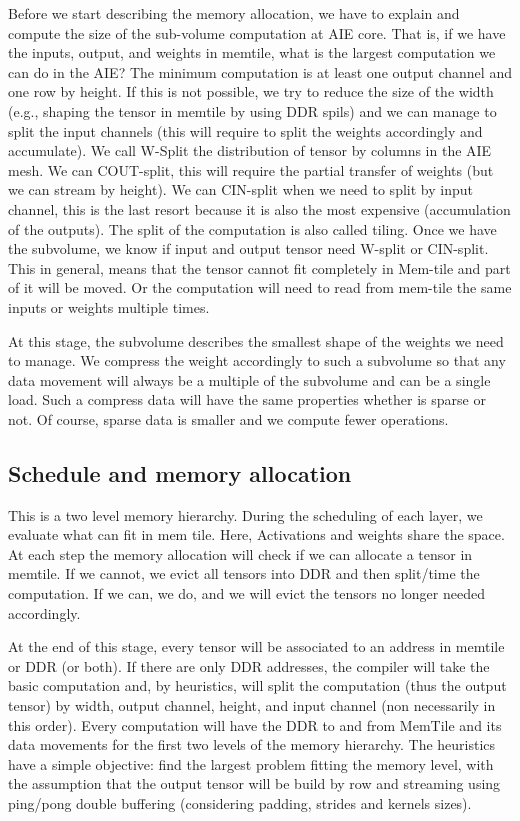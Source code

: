 \documentclass[conference]{IEEEtran}
\begin{document}
Before we start describing the memory allocation, we have to explain
and compute the size of the sub-volume computation at AIE core.  That
is, if we have the inputs, output, and weights in memtile, what is the
largest computation we can do in the AIE? The minimum computation is
at least one output channel and one row by height. If this is not
possible, we try to reduce the size of the width (e.g., shaping the
tensor in memtile by using DDR spils) and we can manage to split the
input channels (this will require to split the weights accordingly and
accumulate). We call W-Split the distribution of tensor by columns in
the AIE mesh. We can COUT-split, this will require the partial
transfer of weights (but we can stream by height).  We can CIN-split
when we need to split by input channel, this is the last resort
because it is also the most expensive (accumulation of the outputs).
The split of the computation is also called tiling. Once we have the
subvolume, we know if input and output tensor need W-split or
CIN-split. This in general, means that the tensor cannot fit
completely in Mem-tile and part of it will be moved. Or the
computation will need to read from mem-tile the same inputs or weights
multiple times.

At this stage, the subvolume describes the smallest shape of the
weights we need to manage. We compress the weight accordingly to such
a subvolume so that any data movement will always be a multiple of the
subvolume and can be a single load. Such a compress data will have the
same properties whether is sparse or not. Of course, sparse data is
smaller and we compute fewer operations.


\subsection{Schedule and memory allocation}
This is a two level memory hierarchy. During the scheduling of each
layer, we evaluate what can fit in mem tile. Here, Activations and
weights share the space. At each step the memory allocation will check
if we can allocate a tensor in memtile. If we cannot, we evict all
tensors into DDR and then split/time the computation. If we can, we
do, and we will evict the tensors no longer needed accordingly.

At the end of this stage, every tensor will be associated to an
address in memtile or DDR (or both). If there are only DDR addresses,
the compiler will take the basic computation and, by heuristics, will
split the computation (thus the output tensor) by width, output
channel, height, and input channel (non necessarily in this
order). Every computation will have the DDR to and from MemTile and
its data movements for the first two levels of the memory
hierarchy. The heuristics have a simple objective: find the largest
problem fitting the memory level, with the assumption that the output
tensor will be build by row and streaming using ping/pong double
buffering (considering padding, strides and kernels sizes).
\end{document}
